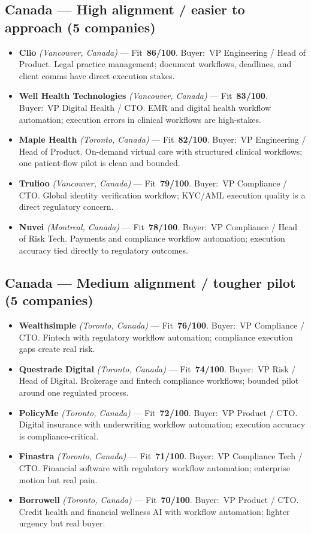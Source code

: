 \documentclass[10pt]{article}
\newcommand{\cand}[5]{\item \textbf{#1} \textit{(#2)} --- Fit~\textbf{#3/100}. Buyer:~#4. #5}
\newcommand{\topcand}[5]{\item \textcolor{green!50!black}{\textbf{#1} \textit{(#2)}} --- Fit~\textbf{#3/100}. Buyer:~#4. #5}
\begin{document}
\subsection{Canada --- High alignment / easier to approach (5 companies)}
\begin{itemize}
\topcand{Clio}{Vancouver, Canada}{86}{VP Engineering / Head of Product}{Legal practice management; document workflows, deadlines, and client comms have direct execution stakes.}
\cand{Well Health Technologies}{Vancouver, Canada}{83}{VP Digital Health / CTO}{EMR and digital health workflow automation; execution errors in clinical workflows are high-stakes.}
\cand{Maple Health}{Toronto, Canada}{82}{VP Engineering / Head of Product}{On-demand virtual care with structured clinical workflows; one patient-flow pilot is clean and bounded.}
\cand{Trulioo}{Vancouver, Canada}{79}{VP Compliance / CTO}{Global identity verification workflow; KYC/AML execution quality is a direct regulatory concern.}
\cand{Nuvei}{Montreal, Canada}{78}{VP Compliance / Head of Risk Tech}{Payments and compliance workflow automation; execution accuracy tied directly to regulatory outcomes.}
\end{itemize}
\subsection{Canada --- Medium alignment / tougher pilot (5 companies)}
\begin{itemize}
\cand{Wealthsimple}{Toronto, Canada}{76}{VP Compliance / CTO}{Fintech with regulatory workflow automation; compliance execution gaps create real risk.}
\cand{Questrade Digital}{Toronto, Canada}{74}{VP Risk / Head of Digital}{Brokerage and fintech compliance workflows; bounded pilot around one regulated process.}
\cand{PolicyMe}{Toronto, Canada}{72}{VP Product / CTO}{Digital insurance with underwriting workflow automation; execution accuracy is compliance-critical.}
\cand{Finastra}{Toronto, Canada}{71}{VP Compliance Tech / CTO}{Financial software with regulatory workflow automation; enterprise motion but real pain.}
\cand{Borrowell}{Toronto, Canada}{70}{VP Product / CTO}{Credit health and financial wellness AI with workflow automation; lighter urgency but real buyer.}
\end{itemize}
\end{document}
